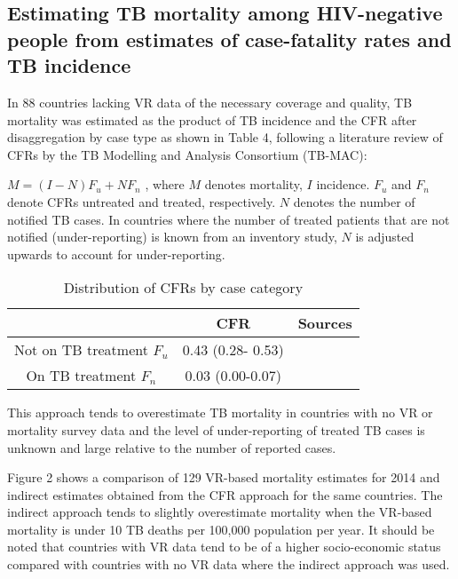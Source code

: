 \subsection{Estimating TB mortality among HIV-negative people from estimates of case-fatality rates and TB incidence
}

In 88 countries lacking VR data of the necessary coverage and quality, TB mortality was estimated as the product of TB incidence and the CFR after disaggregation by case type as shown in Table 4, following a literature review of CFRs by the TB Modelling and Analysis Consortium (TB-MAC):

$M = (I-N)F_u + NF_n$ , where $M$ denotes mortality, $I$ incidence. $F_u$ and $F_n$ denote CFRs untreated and treated, respectively. $N$ denotes the number of notified TB cases. In countries where the number of treated patients that are not notified (under-reporting) is known from an inventory study, $N$ is adjusted upwards to account for under-reporting. 

\begin{table} 
    \begin{tabular}{ c c c }
    \hline
         & CFR & Sources \\ 
         \hline
        Not on TB treatment $F_u$ & 0.43 (0.28- 0.53) &  \cite{12742798} \cite{21483732} \\ 
        On TB treatment $F_n$ & 0.03 (0.00-0.07) &  \cite{21738585} \\ 
        \hline
    \end{tabular} 
    \caption{Distribution of CFRs by case category} 
\end{table}

This approach tends to overestimate TB mortality in countries with no VR or mortality survey data and the level of under-reporting of treated TB cases is unknown and large relative to the number of reported cases. 

Figure 2 shows a comparison of 129 VR-based mortality estimates for 2014 and indirect estimates obtained from the CFR approach for the same countries. The indirect approach tends to slightly overestimate mortality when the VR-based mortality is under 10 TB deaths per 100,000 population per year. It should be noted that countries with VR data tend to be of a higher socio-economic status compared with countries with no VR data where the indirect approach was used.



